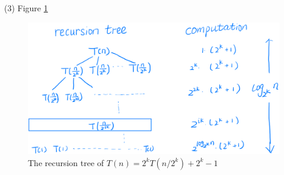 (3) Figure \ref{fig:t1_23}

\begin{figure}[htbp]
    \centering
    \includegraphics[width=0.9\linewidth]{./figure/t1_23.png}
    \caption{The recursion tree of $T(n) = 2^kT(n/2^k) + 2^k-1$}
    \label{fig:t1_23}
\end{figure}


\newpage